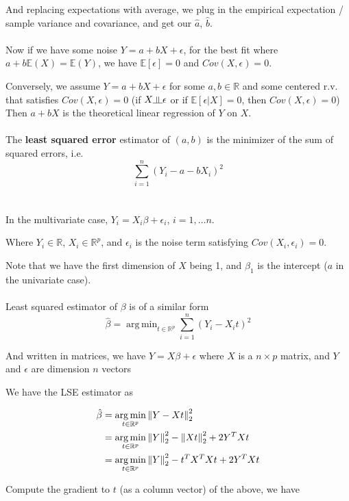 \documentclass{article}
\newcommand{\indep}{\rotatebox[origin=c]{90}{$\models$}}
\DeclareMathOperator*{\argmin}{arg\,min}
\begin{document}
And replacing expectations with average, we plug in the empirical expectation / sample variance and covariance, and get our $\hat{a}$, $\hat{b}$.
\\
\\

Now if we have some noise $Y = a + bX + \epsilon$, for the best fit where $a + b \mathbb{E}(X) = \mathbb{E}(Y)$, we have
$\mathbb{E}[\epsilon] = 0$ and $Cov(X, \epsilon) = 0$.

Conversely, we assume $Y = a + bX + \epsilon$ for some $a, b \in \mathbb{R}$ and some centered r.v. that satisfies $Cov(X, \epsilon) = 0$ (if $X \indep \epsilon$ or if $\mathbb{E}[\epsilon | X] = 0$, then $Cov(X, \epsilon) = 0$)
Then $a + bX$ is the theoretical linear regression of $Y$ on $X$.
\\
\\
The \textbf{least squared error} estimator of $(a, b)$ is the minimizer of the sum of squared errors, i.e.
$$
\sum_{i = 1}^{n}(Y_i - a - bX_i)^2
$$
\\
\\
In the multivariate case, $Y_i = X_i \beta + \epsilon_i$, $i = 1, \dots n$.

Where $Y_i \in \mathbb{R}$, $X_i \in \mathbb{R}^p$, and $\epsilon_i$ is the noise term satisfying $Cov(X_i, \epsilon_i) = 0$.

Note that we have the first dimension of $X$ being 1, and $\beta_1$ is the intercept ($a$ in the univariate case).
\\
\\
Least squared estimator of $\beta$ is of a similar form
$$
\hat{\beta} = \argmin_{t \in \mathbb{R}^p} \sum_{i = 1}^{n}(Y_i - X_i t)^2
$$

And written in matrices, we have $Y = X \beta + \epsilon$ where $X$ is a $n \times p$ matrix, and $Y$ and $\epsilon$ are dimension $n$ vectors

We have the LSE estimator as

\begin{align*}
\hat{\beta} &= \argmin_{t \in \mathbb{R}^p} \norm{Y - Xt}^2_2 \\
            &= \argmin_{t \in \mathbb{R}^p} \norm{Y}^2_2 - \norm{Xt}^2_2 + 2 Y^{T}Xt \\
            &= \argmin_{t \in \mathbb{R}^p} \norm{Y}^2_2 - t^T X^T X t + 2 Y^{T}Xt \\
\end{align*}

Compute the gradient to $t$ (as a column vector) of the above, we have
\end{document}
